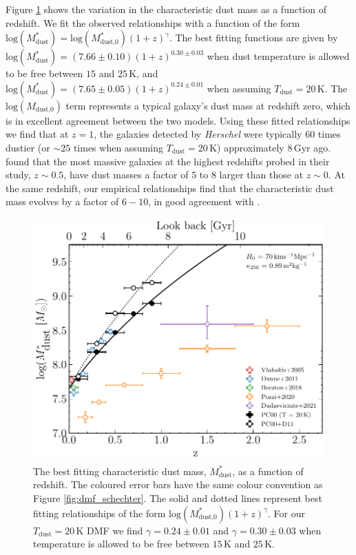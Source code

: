 Figure \ref{fig:dmf_m_evolution} shows the variation in the characteristic dust mass as a function of redshift. We fit the observed relationships with a function of the form $\textrm{log}(M_{\textrm{dust}}^*) = \textrm{log}(M_{\textrm{dust,0}}^*)(1+z)^\gamma$. The best fitting functions are given by $\textrm{log}(M_{\textrm{dust}}^*) = (7.66\pm0.10)(1+z)^{0.30\pm0.03}$ when dust temperature is allowed to be free between $15$ and $25\,$K, and $\textrm{log}(M_{\textrm{dust}}^*) = (7.65\pm0.05)(1+z)^{0.24\pm0.01}$ when assuming $T_{\textrm{dust}} = 20\,$K. The $\textrm{log}(M_{\textrm{dust,0}})$ term represents a typical galaxy's dust mass at redshift zero, which is in excellent agreement between the two models. Using these fitted relationships we find that at $z = 1$, the galaxies detected by \textit{Herschel} were typically $60$ times dustier (or $\sim 25$ times when assuming $T_{\textrm{dust}} = 20\,$K) approximately $8\,$Gyr ago. \citealt{Dunne_2011} found that the most massive galaxies at the highest redshifts probed in their study, $z \sim 0.5$, have dust masses a factor of $5$ to $8$ larger than those at $z \sim 0$. At the same redshift, our empirical relationships find that the characteristic dust mass evolves by a factor of $6 - 10$, in good agreement with \citealt{Dunne_2011}.

\begin{figure}
	\centering
	\includegraphics[width=0.75\columnwidth]{Figures/dmf_m_evolution.pdf}
	\caption[Evolution of the characteristic dust mass, $M_\textrm{dust}^*$, as a function of redshift]{The best fitting characteristic dust mass, $M_\textrm{dust}^*$, as a function of redshift. The coloured error bars have the same colour convention as Figure \ref{fig:dmf_schechter}. The solid and dotted lines represent best fitting relationships of the form $\textrm{log}(M_{\textrm{dust,0}}^*)(1+z)^\gamma$. For our $T_{\textrm{dust}} = 20\,$K DMF we find $\gamma = 0.24\pm0.01$ and $\gamma = 0.30\pm0.03$ when temperature is allowed to be free between $15\,$K and $25\,$K.}
	\label{fig:dmf_m_evolution}
\end{figure}

